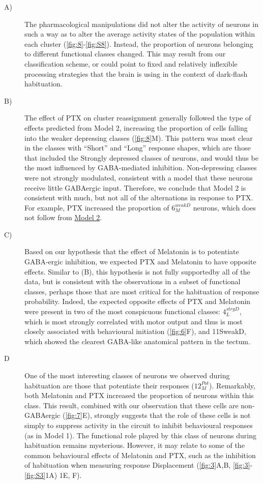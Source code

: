 \documentclass[9pt,lineno]{RandlettLab_elife}
\begin{document}
\begin{description}
\item[A)]
The pharmacological manipulations did not alter the activity of neurons in such a way as to alter the average activity states of the population within each cluster (\autoref{fig:8}-\autoref{fig:S8}). Instead, the proportion of neurons belonging to different functional classes changed. This may result from our classification scheme, or could point to fixed and relatively inflexible processing strategies that the brain is using in the context of dark-flash habituation.
\item[B)]
The effect of PTX on cluster reassignment generally followed the type of effects predicted from Model 2, increasing the proportion of cells falling into the weaker depressing classes (\autoref{fig:8}M). This pattern was most clear in the classes with “Short” and “Long” response shapes, which are those that included the Strongly depressed classes of neurons, and would thus be the most influenced by GABA-mediated inhibition. Non-depressing classes were not strongly modulated, consistent with a model that these neurons receive little GABAergic input. Therefore, we conclude that Model 2 is consistent with much, but not all of the alternations in response to PTX. For example, PTX increased the proportion of $6_{M}^{weakD}$ neurons, which does not follow from \underline{Model 2}.
\item[C)] 
Based on our hypothesis that the effect of Melatonin is to potentiate GABA-ergic inhibition, we expected PTX and Melatonin to have opposite effects. Similar to (B), this hypothesis is not fully supportedby all of the data, but is consistent with the observations in a subset of functional classes, perhaps those that are most critical for the habituation of response probability. Indeed, the expected opposite effects of PTX and Melatonin were present in two of the most conspicuous functional classes: $4_{L}^{strgD}$, which is most strongly correlated with motor output and thus is most closely associated with behavioural initiation (\autoref{fig:6}F), and 11SweakD, which showed the clearest GABA-like anatomical pattern in the tectum. 
\item[D]
One of the most interesting classes of neurons we observed during habituation are those that potentiate their responses ($12_{M}^{Pot}$). Remarkably, both Melatonin and PTX increased the proportion of neurons within this class. This result, combined with our observation that these cells are non-GABAergic (\autoref{fig:7}E), strongly suggests that the role of these cells is not simply to suppress activity in the circuit to inhibit behavioural responses (as in Model 1). The functional role played by this class of neurons during habituation remains mysterious. However, it may relate to some of the common behavioural effects of Melatonin and PTX, such as the inhibition of habituation when measuring response Displacement (\autoref{fig:3}A,B, \autoref{fig:3}-\autoref{fig:S3}1A) 1E, F). 

\end{description}
\end{document}

